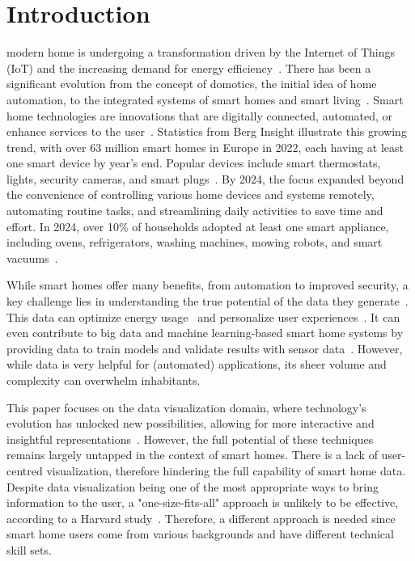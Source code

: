 \documentclass[journal]{IEEEtran}
\begin{document}
\section{Introduction}
 modern home is undergoing a transformation driven by the Internet of Things (IoT) and the increasing demand for energy efficiency~\cite{2023TheNews}. There has been a significant evolution from the concept of domotics, the initial idea of home automation, to the integrated systems of smart homes and smart living~\cite{Solaimani2015WhatLiterature}. Smart home technologies are innovations that are digitally connected, automated, or enhance services to the user~\cite{Urwin2023WhatIn, NarsunStudios2023UsingFuture, Sovacool2020SmartPolicies}. Statistics from Berg Insight illustrate this growing trend, with over 63 million smart homes in Europe in 2022, each having at least one smart device by year's end. Popular devices include smart thermostats, lights, security cameras, and smart plugs~\cite{The2022}. By 2024, the focus expanded beyond the convenience of controlling various home devices and systems remotely, automating routine tasks, and streamlining daily activities to save time and effort. In 2024, over 10\% of households adopted at least one smart appliance, including ovens, refrigerators, washing machines, mowing robots, and smart vacuums~\cite{2024SmartForecast}.

While smart homes offer many benefits, from automation to improved security, a key challenge lies in understanding the true potential of the data they generate~\cite{NarsunStudios2023UsingFuture}. This data can optimize energy usage~\cite{Al-Ali2017AApproach} and personalize user experiences~\cite{Matsui2018AnSensors}. It can even contribute to big data and machine learning-based smart home systems by providing data to train models and validate results with sensor data~\cite{Machorro-Cano2020HEMS-IoT:Saving}. However, while data is very helpful for (automated) applications, its sheer volume and complexity can overwhelm inhabitants.

This paper focuses on the data visualization domain, where technology's evolution has unlocked new possibilities, allowing for more interactive and insightful representations~\cite{Unwin2020WhyVisualization}. However, the full potential of these techniques remains largely untapped in the context of smart homes. There is a lack of user-centred visualization, therefore hindering the full capability of smart home data. Despite data visualization being one of the most appropriate ways to bring information to the user, a "one-size-fits-all" approach is unlikely to be effective, according to a Harvard study~\cite{Unwin2020WhyVisualization}. Therefore, a different approach is needed since smart home users come from various backgrounds and have different technical skill sets.
\end{document}
